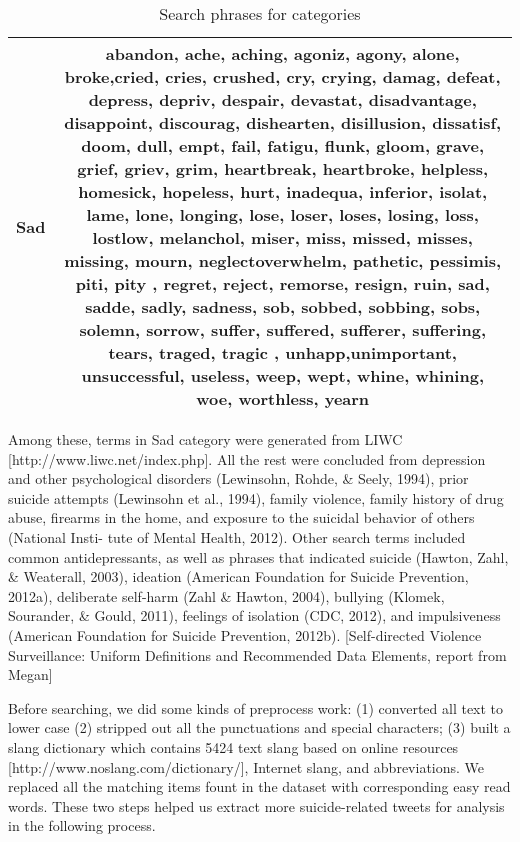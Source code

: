 \documentclass[11pt]{article}
\begin{document}
\begin{table*}
\begin{tabulary}{500pt}{|C|C|}
   Sad                                   & abandon, ache, aching, agoniz, agony, alone, broke,cried, cries, crushed, cry, crying, damag, defeat, depress, depriv, despair, devastat, disadvantage, disappoint, discourag, dishearten, disillusion, dissatisf, doom, dull, empt, fail, fatigu, flunk, gloom, grave, grief, griev, grim, heartbreak, heartbroke, helpless, homesick, hopeless, hurt, inadequa, inferior, isolat, lame, lone, longing, lose, loser, loses, losing, loss, lostlow, melanchol, miser, miss, missed, misses, missing, mourn, neglectoverwhelm, pathetic, pessimis, piti, pity , regret, reject, remorse, resign, ruin, sad, sadde, sadly, sadness, sob, sobbed, sobbing, sobs, solemn, sorrow, suffer, suffered, sufferer, suffering, tears, traged, tragic , unhapp,unimportant, unsuccessful, useless, weep, wept, whine, whining, woe, worthless, yearn \\ \hline

  
    \end{tabulary}
\caption{Search phrases for categories}
  \label{Table:1}
\end{table*}


Among these, terms in Sad category were generated from LIWC [http://www.liwc.net/index.php]. All the rest were concluded from depression and other psychological disorders (Lewinsohn, Rohde, \& Seely, 1994), prior suicide attempts (Lewinsohn et al., 1994), family violence, family history of drug abuse, firearms in the home, and exposure to the suicidal behavior of others (National Insti- tute of Mental Health, 2012). Other search terms included common antidepressants, as well as phrases that indicated suicide (Hawton, Zahl, \& Weaterall, 2003), ideation (American Foundation for Suicide Prevention, 2012a), deliberate self-harm (Zahl \& Hawton, 2004), bullying (Klomek, Sourander, \& Gould, 2011), feelings of isolation (CDC, 2012), and impulsiveness (American Foundation for Suicide Prevention, 2012b). [Self-directed Violence Surveillance: Uniform Definitions and Recommended Data Elements, report from Megan]

Before searching, we did some kinds of preprocess work:  (1) converted all text to lower case (2) stripped out all the punctuations and special characters; (3) built a slang dictionary which contains 5424 text slang based on online resources [http://www.noslang.com/dictionary/], Internet slang, and abbreviations. We replaced all the matching items fount in the dataset with corresponding easy read words. These two steps helped us extract more suicide-related tweets for analysis in the following process.
\end{document}
